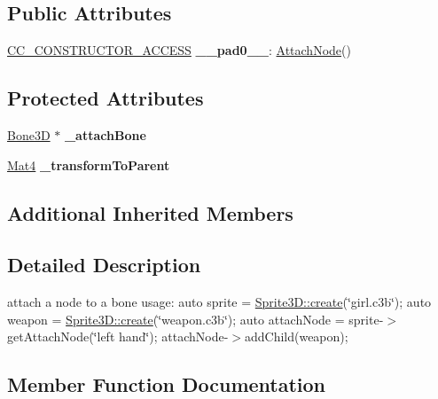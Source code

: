 \subsection*{Public Attributes}
\begin{DoxyCompactItemize}
\item 
\mbox{\label{classAttachNode_a5f6d816d33aea261ab2911feefd672df}} 
\hyperlink{_2cocos2d_2cocos_2base_2ccConfig_8h_a25ef1314f97c35a2ed3d029b0ead6da0}{C\+C\+\_\+\+C\+O\+N\+S\+T\+R\+U\+C\+T\+O\+R\+\_\+\+A\+C\+C\+E\+SS} {\bfseries \+\_\+\+\_\+pad0\+\_\+\+\_\+}\+: \hyperlink{classAttachNode}{Attach\+Node}()
\end{DoxyCompactItemize}
\subsection*{Protected Attributes}
\begin{DoxyCompactItemize}
\item 
\mbox{\label{classAttachNode_acb4bca7727e265c9bd9fa50a3158ce9b}} 
\hyperlink{classBone3D}{Bone3D} $\ast$ {\bfseries \+\_\+attach\+Bone}
\item 
\mbox{\label{classAttachNode_a94c93d9889c8bcfa6a3017b8a32be0dc}} 
\hyperlink{classMat4}{Mat4} {\bfseries \+\_\+transform\+To\+Parent}
\end{DoxyCompactItemize}
\subsection*{Additional Inherited Members}


\subsection{Detailed Description}
attach a node to a bone usage\+: auto sprite = \hyperlink{classSprite3D_a10905e0480bfcf875882a9ad7b538d78}{Sprite3\+D\+::create}(\char`\"{}girl.\+c3b\char`\"{}); auto weapon = \hyperlink{classSprite3D_a10905e0480bfcf875882a9ad7b538d78}{Sprite3\+D\+::create}(\char`\"{}weapon.\+c3b\char`\"{}); auto attach\+Node = sprite-\/$>$get\+Attach\+Node(\char`\"{}left hand\char`\"{}); attach\+Node-\/$>$add\+Child(weapon); 

\subsection{Member Function Documentation}
\mbox{\label{classAttachNode_aaff0bb8854efd2f675e35cfd6f82e6d5}} 
